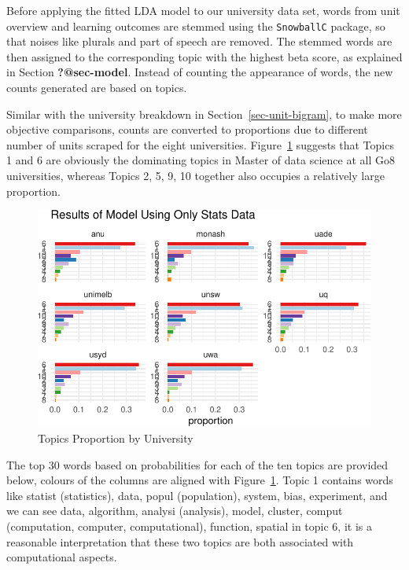 \documentclass[
  letterpaper,
]{report}
\begin{document}
Before applying the fitted LDA model to our university data set, words
from unit overview and learning outcomes are stemmed using the
\texttt{SnowballC} package, so that noises like plurals and part of
speech are removed. The stemmed words are then assigned to the
corresponding topic with the highest beta score, as explained in Section
\textbf{?@sec-model}. Instead of counting the appearance of words, the
new counts generated are based on topics.

Similar with the university breakdown in Section~\ref{sec-unit-bigram},
to make more objective comparisons, counts are converted to proportions
due to different number of units scraped for the eight universities.
Figure~\ref{fig-unitopics} suggests that Topics 1 and 6 are obviously
the dominating topics in Master of data science at all Go8 universities,
whereas Topics 2, 5, 9, 10 together also occupies a relatively large
proportion.

\begin{figure}

{\centering \includegraphics{./04_1-unilda_files/figure-pdf/fig-unitopics-1.pdf}

}

\caption{\label{fig-unitopics}Topics Proportion by University}

\end{figure}

The top 30 words based on probabilities for each of the ten topics are
provided below, colours of the columns are aligned with
Figure~\ref{fig-unitopics}. Topic 1 contains words like statist
(statistics), data, popul (population), system, bias, experiment, and we
can see data, algorithm, analysi (analysis), model, cluster, comput
(computation, computer, computational), function, spatial in topic 6, it
is a reasonable interpretation that these two topics are both associated
with computational aspects.
\end{document}
